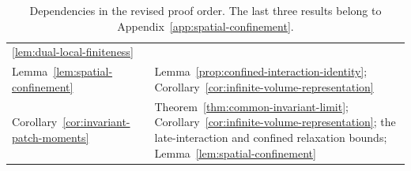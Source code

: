 \documentclass[EJP,preprint,NODS,nobera]{ejpecp}
\newcommand{\rev}[1]{{\color{red}#1}}
\begin{document}
\begin{table}[htbp]
{\begin{tabularx}{\linewidth}{@{}lX@{}}
\ref{lem:dual-local-finiteness}\\
Lemma~\ref{lem:spatial-confinement} &
Lemma~\ref{prop:confined-interaction-identity};
Corollary~\ref{cor:infinite-volume-representation}\\
Corollary~\ref{cor:invariant-patch-moments} &
Theorem~\ref{thm:common-invariant-limit};
Corollary~\ref{cor:infinite-volume-representation};
the late-interaction and confined relaxation bounds;
Lemma~\ref{lem:spatial-confinement}\\
\hline
\end{tabularx}
}
\caption{\rev{Dependencies in the revised proof order. The last three results
belong to Appendix~\ref{app:spatial-confinement}.}}
\label{tab:dependencies}
\end{table}
\FloatBarrier



\end{document}
